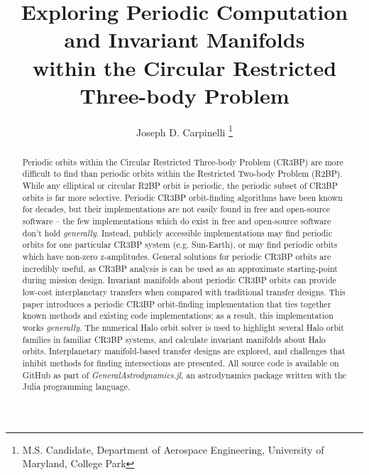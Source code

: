 \documentclass[conf]{new-aiaa}
\title{Exploring Periodic Computation and Invariant Manifolds \\ within the Circular Restricted Three-body Problem}
\author{Joseph D. Carpinelli
    \footnote{
        M.S. Candidate, 
        Department of Aerospace Engineering, 
        University of Maryland, College Park}}
\begin{document}
\maketitle

\begin{abstract}
    Periodic orbits within the Circular Restricted Three-body Problem 
    (CR3BP) are more difficult to find than periodic orbits within the 
    Restricted Two-body Problem (R2BP). While any  elliptical or circular 
    R2BP orbit is periodic, the periodic subset of CR3BP orbits is far 
    more selective. Periodic CR3BP orbit-finding algorithms 
    have been known for decades, but their implementations are not easily
    found in free and open-source software -- the few implementations
    which do exist in free and open-source software don't hold 
    \textit{generally}. Instead, publicly accessible implementations may 
    find periodic orbits for one particular CR3BP system (e.g. Sun-Earth), 
    or  may find periodic orbits which have non-zero z-amplitudes. 
    General solutions for periodic CR3BP orbits are incredibly useful, as 
    CR3BP analysis is can be used as an approximate starting-point during 
    mission design. Invariant manifolds about periodic 
    CR3BP orbits can provide low-cost interplanetary transfers when 
    compared with traditional transfer designs. This paper introduces 
    a periodic CR3BP orbit-finding implementation that ties together
    known methods and existing code implementations; as a result, 
    this implementation works \textit{generally}. The numerical Halo 
    orbit solver is used to highlight several
    Halo orbit families in familiar CR3BP systems, and calculate invariant 
    manifolds about Halo orbits. Interplanetary manifold-based transfer
    designs are explored, and challenges that inhibit methods for 
    finding intersections are presented. All source code 
    is available on GitHub as part of 
    \textit{GeneralAstrodynamics.jl}, an astrodynamics package written 
    with the Julia programming language.
\end{abstract}
\end{document}
